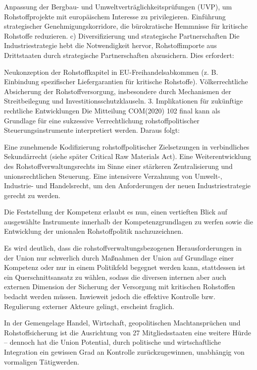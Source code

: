 \documentclass[12pt,a4paper,oneside]{book} %
\begin{document}
Anpassung der Bergbau- und Umweltverträglichkeitsprüfungen (UVP), um Rohstoffprojekte mit europäischem Interesse zu privilegieren.
Einführung strategischer Genehmigungskorridore, die bürokratische Hemmnisse für kritische Rohstoffe reduzieren.
c) Diversifizierung und strategische Partnerschaften
Die Industriestrategie hebt die Notwendigkeit hervor, Rohstoffimporte aus Drittstaaten durch strategische Partnerschaften abzusichern. Dies erfordert:

Neukonzeption der Rohstoffkapitel in EU-Freihandelsabkommen (z. B. Einbindung spezifischer Liefergarantien für kritische Rohstoffe).
Völkerrechtliche Absicherung der Rohstoffversorgung, insbesondere durch Mechanismen der Streitbeilegung und Investitionsschutzklauseln.
3. Implikationen für zukünftige rechtliche Entwicklungen
Die Mitteilung COM(2020) 102 final kann als Grundlage für eine sukzessive Verrechtlichung rohstoffpolitischer Steuerungsinstrumente interpretiert werden. Daraus folgt:

Eine zunehmende Kodifizierung rohstoffpolitischer Zielsetzungen in verbindliches Sekundärrecht (siehe später Critical Raw Materials Act).
Eine Weiterentwicklung des Rohstoffverwaltungsrechts im Sinne einer stärkeren Zentralisierung und unionsrechtlichen Steuerung.
Eine intensivere Verzahnung von Umwelt-, Industrie- und Handelsrecht, um den Anforderungen der neuen Industriestrategie gerecht zu werden.

Die Feststellung der Kompetenz erlaubt es nun, einen vertieften Blick auf ausgewählte Instrumente innerhalb der Kompetenzgrundlagen zu werfen sowie die Entwicklung der unionalen Rohstoffpolitik nachzuzeichnen.

Es wird deutlich, dass die rohstoffverwaltungsbezogenen Herausforderungen in der Union nur schwerlich durch Maßnahmen der Union auf Grundlage einer Kompetenz oder nur in einem Politikfeld begegnet werden kann, stattdessen ist ein Querschnittsansatz zu wählen, sodass die diversen internen aber auch externen Dimension der Sicherung der Versorgung mit kritischen Rohstoffen bedacht werden müssen. Inwieweit jedoch die effektive Kontrolle bzw. Regulierung externer Akteure gelingt, erscheint fraglich.

In der Gemengelage Handel, Wirtschaft, geopolitischen Machtansprüchen und Rohstoffsicherung ist die Ausrichtung von 27 Mitgliedsstaaten eine weitere Hürde -- dennoch hat die Union Potential, durch politische und wirtschaftliche Integration ein gewissen Grad an Kontrolle zurückzugewinnen, unabhängig von vormaligen Tätigwerden.
\end{document}
